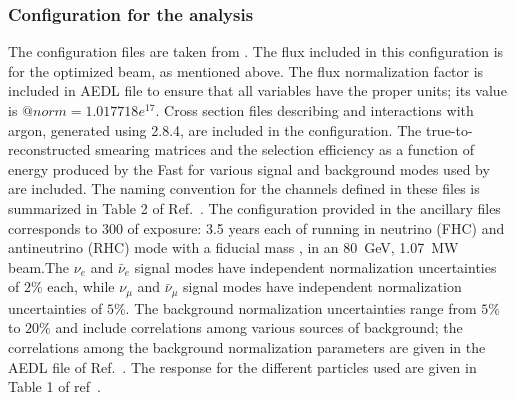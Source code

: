  \subsubsection{  Configuration for the  analysis}
 
The   configuration files are taken from \cite{Alion:2016uaj}.  The flux included in this configuration is for the optimized beam, as mentioned above. 
 The flux normalization factor is included in   AEDL 
 file to ensure that all variables have the proper units; its value is $@norm = 1.017718e^{17}$. Cross section files describing  and  interactions with argon, generated using  2.8.4, are included in the configuration. The true-to-reconstructed
smearing matrices and the selection efficiency as a function of energy produced by the Fast  for various signal and background modes used by   are included.
  The naming convention for the channels defined in these files is summarized in Table 2 of Ref.~\cite{Alion:2016uaj}. The   configuration provided in the ancillary files corresponds to \SI{300}{\ktMWyr} of exposure: 3.5 years each of running in neutrino (FHC) and antineutrino (RHC) mode 
 with a \fdfiducialmass fiducial mass , in an \SI{80}{GeV}, \SI{1.07}{MW} beam.The $\nu_{e}$ and $\bar\nu_{e}$ signal  modes have independent normalization uncertainties of $2\%$ each, while $\nu_{\mu}$ and $\bar{\nu}_{\mu}$ signal modes have independent normalization uncertainties of $5\%$. The background normalization uncertainties range from $5\%$ to $20\%$ and include
correlations among various sources of background; the correlations among the background normalization
parameters %
are given in the AEDL file of Ref.~\cite{Alion:2016uaj}. The  response for the different particles used %
are given in Table 1 of ref~\cite{Alion:2016uaj}.

